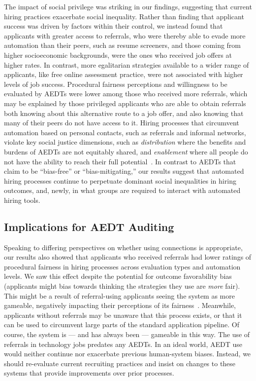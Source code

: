 The impact of social privilege was striking in our findings, suggesting that current hiring practices exacerbate social inequality. Rather than finding that applicant success was driven by factors within their control, we instead found that applicants with greater access to referrals, who were thereby able to evade more automation than their peers, such as resume screeners, and those coming from higher socioeconomic backgrounds, were the ones who received job offers at higher rates. In contrast, more egalitarian strategies available to a wider range of applicants, like free online assessment practice, were not associated with higher levels of job success. Procedural fairness perceptions and willingness to be evaluated by AEDTs were lower among those who received more referrals, which may be explained by those privileged applicants who are able to obtain referrals both knowing about this alternative route to a job offer, and also knowing that many of their peers do not have access to it. Hiring processes that circumvent automation based on personal contacts, such as referrals and informal networks, violate key social justice dimensions, such as \textit{distribution} where the benefits and burdens of AEDTs are not equitably shared, and \textit{enablement} where all people do not have the ability to reach their full potential~\cite{dombrowski2016social}. In contrast to AEDTs that claim to be ``bias-free'' or ``bias-mitigating,'' our results suggest that automated hiring processes continue to perpetuate dominant social inequalities in hiring outcomes, and, newly, in what groups are required to interact with automated hiring tools.

\subsection{Implications for AEDT Auditing}

Speaking to differing perspectives on whether using connections is appropriate, our results also showed that applicants who received referrals had lower ratings of procedural fairness in hiring processes across evaluation types and automation levels. We saw this effect despite the potential for outcome favorability bias~\cite{wang2020factors} (applicants might bias towards thinking the strategies they use are \textit{more} fair). This might be a result of referral-using applicants seeing the system as more gameable, negatively impacting their perceptions of its fairness~\cite{armstrong2023navigating, chua2021playing, leclercq2020gamification}. Meanwhile, applicants without referrals may be unaware that this process exists, or that it can be used to circumvent large parts of the standard application pipeline. Of course, the system is --- and has always been --- gameable in this way. The use of referrals in technology jobs predates any AEDTs. In an ideal world, AEDT use would neither continue nor exacerbate previous human-system biases. Instead, we should re-evaluate current recruiting practices and insist on changes to these systems that provide improvements over prior processes. 

